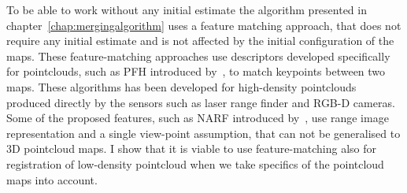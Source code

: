 To be able to work without any initial estimate the algorithm presented in chapter~\ref{chap:mergingalgorithm} uses a feature matching approach, that does not require any initial estimate and is not affected by the initial configuration of the maps. These feature-matching approaches use descriptors developed specifically for pointclouds, such as \gls{PFH} introduced by~\cite{rusu2008pfh}, to match keypoints between two maps. These algorithms has been developed for high-density pointclouds produced directly by the sensors such as laser range finder and RGB-D cameras. Some of the proposed features, such as \gls{NARF} introduced by~\cite{steder2010narf}, use range image representation and a single view-point assumption, that can not be generalised to 3D pointcloud maps. I show that it is viable to use feature-matching also for registration of low-density pointcloud when we take specifics of the pointcloud maps into account.
